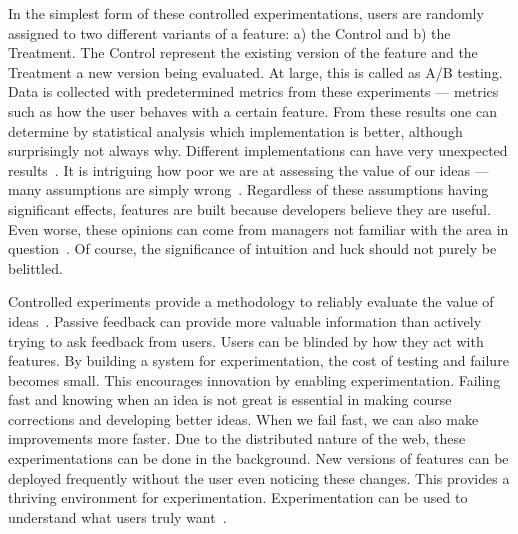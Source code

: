 \documentclass[english]{tktltiki2}
\begin{document}
In the simplest form of these controlled experimentations, users are randomly assigned to two different variants of a feature: a) the Control and b) the Treatment. The Control represent the existing version of the feature and the Treatment a new version being evaluated. At large, this is called as A/B testing. Data is collected with predetermined metrics from these experiments — metrics such as how the user behaves with a certain feature. From these results one can determine by statistical analysis which implementation is better, although surprisingly not always why. Different implementations can have very unexpected results~\cite{KLS09, KDF12, McK12}. It is intriguing how poor we are at assessing the value of our ideas — many assumptions are simply wrong~\cite{BE12, KDF12}. Regardless of these assumptions having significant effects, features are built because developers believe they are useful. Even worse, these opinions can come from managers not familiar with the area in question~\cite{KLS09, BE12, Bos12}. Of course, the significance of intuition and luck should not purely be belittled.

Controlled experiments provide a methodology to reliably evaluate the value of ideas~\cite{KR04, KLS09, McK12, Rho14, Wan14}. Passive feedback can provide more valuable information than actively trying to ask feedback from users. Users can be blinded by how they act with features. By building a system for experimentation, the cost of testing and failure becomes small. This encourages innovation by enabling experimentation. Failing fast and knowing when an idea is not great is essential in making course corrections and developing better ideas. When we fail fast, we can also make improvements more faster. Due to the distributed nature of the web, these experimentations can be done in the background. New versions of features can be deployed frequently without the user even noticing these changes. This provides a thriving environment for experimentation. Experimentation can be used to understand what users truly want~\cite{Wan14}.
\end{document}
